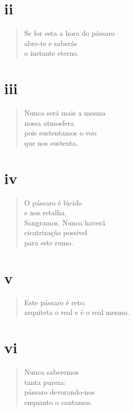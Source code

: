 \medskip
\section{ii}

\begin{verse}
Se for esta a hora do pássaro\\
abre-te e saberás\\
o instante eterno.
\end{verse}

\medskip
\section{iii}

\begin{verse}
Nunca será mais a mesma\\
nossa atmosfera\\
pois sustentamos o voo\\
que nos sustenta.
\end{verse}

\medskip
\section{iv}

\begin{verse}
O pássaro é lúcido\\
e nos retalha.\\
Sangramos. Nunca haverá\\
cicatrização possível\\
para este rumo.
\end{verse}

\medskip
\section{v}

\begin{verse}
Este pássaro é reto;\\
arquiteta o real e é o real mesmo.
\end{verse}

\medskip
\section{vi}

\begin{verse}
Nunca saberemos\\
tanta pureza:\\
pássaro devorando-nos\\
enquanto o cantamos.
\end{verse}

